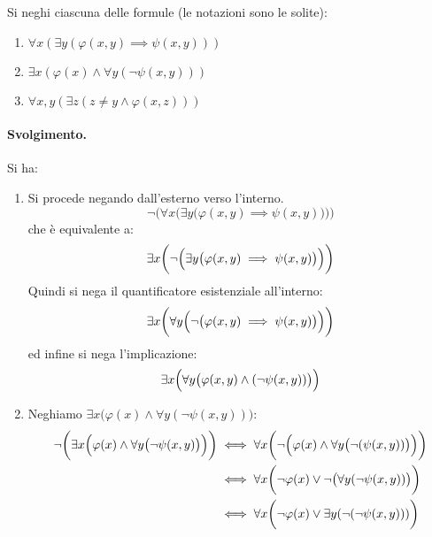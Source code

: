 \begin{exsbox}
	Si neghi ciascuna delle formule (le notazioni sono le solite):
	\begin{enumerate}
		\item $\forall x (\exists y (\varphi(x,y)\implies \psi(x,y)))$
		\item $\exists x (\varphi(x) \land \forall y(\neg \psi(x,y)))$
		\item $\forall x,y(\exists z(z \neq y \land \varphi(x,z)))$
	\end{enumerate}
\end{exsbox}
\paragraph*{Svolgimento.}
Si ha:
\begin{enumerate}
	\item Si procede negando dall'esterno verso l'interno.
	\begin{displaymath}	\neg \Biggl(\forall x \biggl( \exists y \bigl( \varphi(x,y) \implies \psi (x,y) \bigr) \biggr) \Biggr)
	\end{displaymath}
	che è equivalente a:
	\begin{displaymath}
		\exists x \biggl(\neg \Bigl( \exists y \bigl(\varphi(x,y)\implies \psi(x,y) \bigr) \Bigr)\biggr)
	\end{displaymath}
	Quindi si nega il quantificatore esistenziale all'interno:
	\begin{displaymath}
		\exists x \biggl( \forall y \Bigl( \neg \bigl( \varphi(x,y) \implies \psi(x,y) \bigr)\Bigr)\biggr)
	\end{displaymath}
	ed infine si nega l'implicazione:
	\begin{displaymath}
		\exists x \Bigl( \forall y \bigl( \varphi(x,y) \land (\neg \psi(x,y))\bigr)\Bigr)
	\end{displaymath}
	\item Neghiamo $\exists x \bigl( \varphi(x) \land \forall y (\neg \psi(x,y) ) \bigr)$:
	\begin{align*}
		\neg \biggl( \exists x \Bigl( \varphi(x) \land \forall y \bigl( \neg \psi(x,y) \bigr) \Bigr) \biggr) &\iff \forall x \biggl(  \neg \Bigl(  \varphi(x) \land \forall y \bigl( \neg (\psi (x,y)) \bigr)    \Bigr)   \biggr) \\
		&\iff  \forall x \biggl(   \neg \varphi(x) \lor \neg \bigl( \forall y (\neg \psi(x,y) )  \bigr)\biggr) \\
		&\iff \forall x \biggl( \neg \varphi(x) \lor \exists y(\neg(\neg \psi(x,y))) \biggr)\\

\end{align*}
\end{enumerate}
